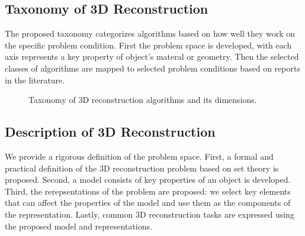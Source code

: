 \subsection{Taxonomy of 3D Reconstruction}
The proposed taxonomy categorizes algorithms based on how well they work on the specific problem condition. First the problem space is developed, with each axis represents a key property of object's materal or geometry. Then the selected classes of algorithms are mapped to selected problem conditions based on reports in the literature.
\begin{figure}[ht]
\centering
{}
\caption{Taxonomy of 3D reconstruction algorithms and its dimensions.}
\label{fig:overview_taxonomy}
\end{figure}

\subsection{Description of 3D Reconstruction}
We provide a rigorous definition of the problem space. First, a formal and practical definition of the 3D reconstruction problem based on set theory is proposed. Second, a model consists of key properties of an object is developed. Third, the rerepsentations of the problem are proposed: we select key elements that can affect the properties of the model and use them as the components of the representation. Lastly, common 3D reconstruction tasks are expressed using the proposed model and representations.

